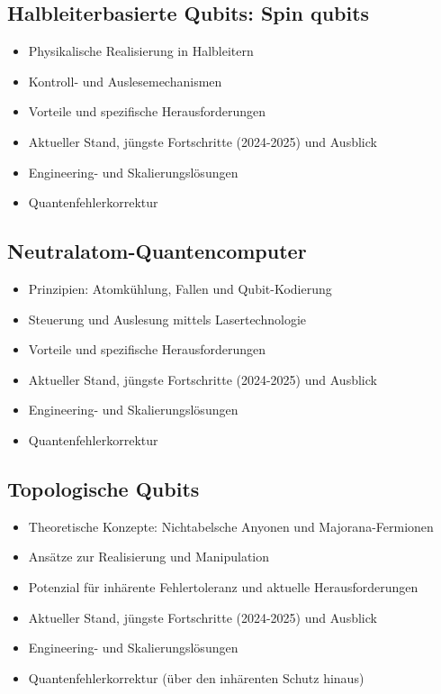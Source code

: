 \subsection{Halbleiterbasierte Qubits: Spin qubits}
    \begin{itemize}
        \item Physikalische Realisierung in Halbleitern
        \item Kontroll- und Auslesemechanismen
        \item Vorteile und spezifische Herausforderungen
        \item Aktueller Stand, jüngste Fortschritte (2024-2025) und Ausblick
        \item Engineering- und Skalierungslösungen
        \item Quantenfehlerkorrektur
    \end{itemize}

\subsection{Neutralatom-Quantencomputer}
    \begin{itemize}
        \item Prinzipien: Atomkühlung, Fallen und Qubit-Kodierung
        \item Steuerung und Auslesung mittels Lasertechnologie
        \item Vorteile und spezifische Herausforderungen
        \item Aktueller Stand, jüngste Fortschritte (2024-2025) und Ausblick
        \item Engineering- und Skalierungslösungen
        \item Quantenfehlerkorrektur
    \end{itemize}

\subsection{Topologische Qubits}
    \begin{itemize}
        \item Theoretische Konzepte: Nichtabelsche Anyonen und Majorana-Fermionen
        \item Ansätze zur Realisierung und Manipulation
        \item Potenzial für inhärente Fehlertoleranz und aktuelle Herausforderungen
        \item Aktueller Stand, jüngste Fortschritte (2024-2025) und Ausblick
        \item Engineering- und Skalierungslösungen
        \item Quantenfehlerkorrektur (über den inhärenten Schutz hinaus)
    \end{itemize}



